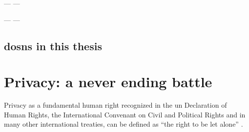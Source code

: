 \documentclass[showtrims,oldfontcommands]{kthesis}
\begin{document}
---
---

---
%
%
%
---

\subsection{\aclp{dosn} in this thesis}


\section{Privacy: a never ending battle}
Privacy as a fundamental human right recognized in the \ac{un} Declaration of Human 
Rights, the International Convenant on Civil and Political Rights and in many other 
international treaties, can be defined as ``the right to be let alone'' \cite{The Right to Privacy (article)
}.
\end{document}
